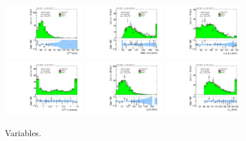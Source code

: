 \begin{figure}[!htpb]
  \includegraphics[width=0.30\textwidth]{figures/analysis/vbf-ZllCR/met-pt-hi}
  \includegraphics[width=0.30\textwidth]{figures/analysis/vbf-ZllCR/mMMC}
  \includegraphics[width=0.30\textwidth]{figures/analysis/vbf-ZllCR/mT-hi} \\
  \includegraphics[width=0.30\textwidth]{figures/analysis/vbf-ZllCR/met-phi-centrality}
  \includegraphics[width=0.30\textwidth]{figures/analysis/vbf-ZllCR/H-pt-hi}
  \includegraphics[width=0.30\textwidth]{figures/analysis/vbf-ZllCR/mvis} \\
  \caption{Variables.}
  \label{fig:backgrounds-ZllCR-taus}
\end{figure}

